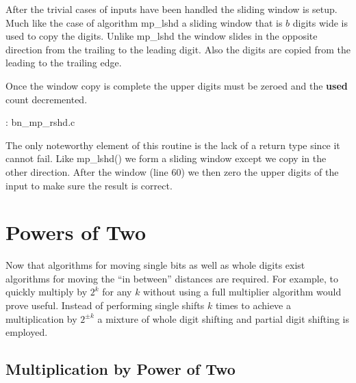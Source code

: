 \documentclass[b5paper]{book}
\begin{document}
After the trivial cases of inputs have been handled the sliding window is setup.  Much like the case of algorithm mp\_lshd a sliding window that
is $b$ digits wide is used to copy the digits.  Unlike mp\_lshd the window slides in the opposite direction from the trailing to the leading digit.  
Also the digits are copied from the leading to the trailing edge.

Once the window copy is complete the upper digits must be zeroed and the \textbf{used} count decremented.

\vspace{+3mm}\begin{small}
\hspace{-5.1mm}{\bf File}: bn\_mp\_rshd.c
\vspace{-3mm}
\begin{alltt}
\end{alltt}
\end{small}

The only noteworthy element of this routine is the lack of a return type since it cannot fail.  Like mp\_lshd() we
form a sliding window except we copy in the other direction.  After the window (line 60) we then zero
the upper digits of the input to make sure the result is correct.

\section{Powers of Two}

Now that algorithms for moving single bits as well as whole digits exist algorithms for moving the ``in between'' distances are required.  For 
example, to quickly multiply by $2^k$ for any $k$ without using a full multiplier algorithm would prove useful.  Instead of performing single
shifts $k$ times to achieve a multiplication by $2^{\pm k}$ a mixture of whole digit shifting and partial digit shifting is employed.  

\subsection{Multiplication by Power of Two}
\end{document}
